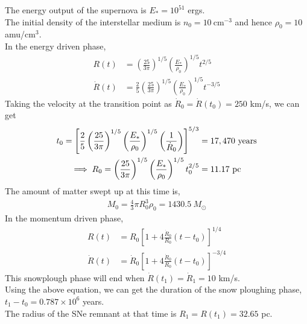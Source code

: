 \documentclass{jhwhw}
\begin{document}
\solution
The energy output of the supernova is $E_* = 10^{51}$ ergs.\\
The initial density of the interstellar medium is  $n_0 = 10 ~$cm$^{-3}$ and hence $\rho_0 = 10 ~$amu/cm$^{3}$.\\
In the energy driven phase,
\begin{align}
R(t) &= \left( \frac{25}{3 \pi} \right) ^{1/5}  \left( \frac{{E}_*}{\rho_0} \right)^{1/5}  t^{2/5}\\
\dot{R}(t) &= \frac{2}{5} \left( \frac{25}{3 \pi} \right) ^{1/5}  \left( \frac{{E}_*}{\rho_0} \right)^{1/5}  t^{-3/5}
\end{align}
Taking the velocity at the transition point as $\dot{R}_0= \dot{R}(t_0) = 250$ km/s, we can get
\begin{align}
t_0 = \left[ \frac{2}{5} \left( \frac{25}{3 \pi} \right) ^{1/5}  \left( \frac{{E}_*}{\rho_0} \right)^{1/5} \left( \frac{1}{\dot{R}_0}\right) \right]^{5/3} &= 17,470 ~\rm{years}\\
\implies R_0 = \left( \frac{25}{3 \pi} \right) ^{1/5}  \left( \frac{{E}_*}{\rho_0} \right)^{1/5}  t_0^{2/5} &= 11.17 ~\rm{pc}
\end{align}
The amount of matter swept up at this time is,
\begin{align}
M_0 = \frac{4}{3} \pi R_0^3 \rho_0 = 1430.5 ~M_{\odot}
\end{align}
%
In the momentum driven phase,
\begin{align}
R(t) &= R_0 \left[ 1 + 4 \frac{\dot{R}_0}{R_0} (t-t_0) \right]^{1/4}\\
\dot{R}(t) &= \dot{R}_0 \left[ 1 + 4 \frac{\dot{R}_0}{R_0} (t-t_0) \right]^{-3/4}
\end{align}
%
This snowplough phase will end when $\dot{R}(t_1)=\dot{R}_1 = 10$ km/s. \\
Using the above equation, we can get the duration of the snow ploughing phase,\\
  $t_1-t_0=0.787 \times 10^6$ years.\\
The radius of the SNe remnant at that time is
$R_1 = R(t_1) = 32.65 $ pc.

















\end{document}
